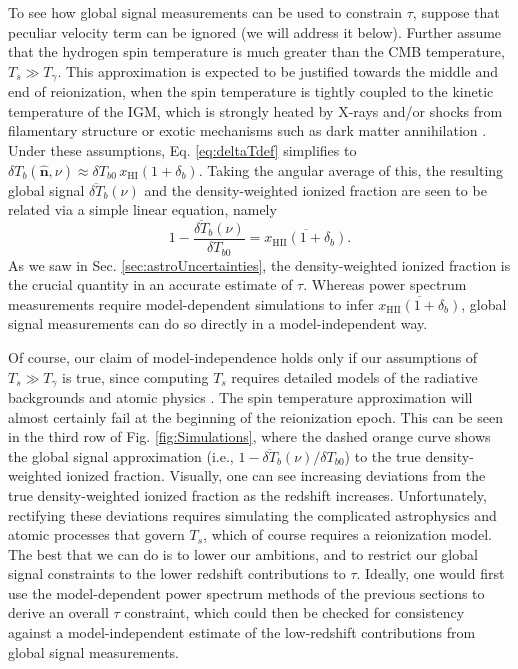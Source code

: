 \documentclass[twocolumn,aps,prd,nofootinbib,showpacs,superscriptaddress]{revtex4-1}
\begin{document}
To see how global signal measurements can be used to constrain $\tau$, suppose that peculiar velocity term can be ignored (we will address it below). Further assume that the hydrogen spin temperature is much greater than the CMB temperature, $T_s \gg T_\gamma$. This approximation is expected to be justified towards the middle and end of reionization, when the spin temperature is tightly coupled to the kinetic temperature of the IGM, which is strongly heated by X-rays and/or shocks from filamentary structure or exotic mechanisms such as dark matter annihilation \cite{gnedin_and_shaver2004,pritchard_and_loeb2010,mirabel_et_al2011,valdes_et_al2013,evoli_et_al2014}. Under these assumptions, Eq. \eqref{eq:deltaTdef} simplifies to $\delta T_b(\mathbf{\hat{n}}, \nu) \approx \delta T_{b0}\, x_\textrm{HI}  (1 + \delta_b)$. Taking the angular average of this, the resulting global signal $\overline{\delta T}_b (\nu)$ and the density-weighted ionized fraction are seen to be related via a simple linear equation, namely
\begin{equation}
\label{eq:globalSigDirect}
1- \frac{\overline{\delta T}_b (\nu)}{\delta T_{b0}} = \overline{x_\textrm{HII} (1+\delta_b)}.
\end{equation}
As we saw in Sec. \ref{sec:astroUncertainties}, the density-weighted ionized fraction is the crucial quantity in an accurate estimate of $\tau$. Whereas power spectrum measurements require model-dependent simulations to infer $\overline{x_\textrm{HII} (1+\delta_b)}$, global signal measurements can do so directly in a model-independent way.

Of course, our claim of model-independence holds only if our assumptions of $T_s \gg T_\gamma$ is true, since computing $T_s$ requires detailed models of the radiative backgrounds and atomic physics \cite{hirata2006,hirata_and_sigurdson2007}. The spin temperature approximation will almost certainly fail at the beginning of the reionization epoch. This can be seen in the third row of Fig. \ref{fig:Simulations}, where the dashed orange curve shows the global signal approximation (i.e., $1- \overline{\delta T}_b (\nu)/\delta T_{b0}$) to the true density-weighted ionized fraction. Visually, one can see increasing deviations from the true density-weighted ionized fraction as the redshift increases. Unfortunately, rectifying these deviations requires simulating the complicated astrophysics and atomic processes that govern $T_s$, which of course requires a reionization model. The best that we can do is to lower our ambitions, and to restrict our global signal constraints to the lower redshift contributions to $\tau$. Ideally, one would first use the model-dependent power spectrum methods of the previous sections to derive an overall $\tau$ constraint, which could then be checked for consistency against a model-independent estimate of the low-redshift contributions from global signal measurements.
\end{document}

